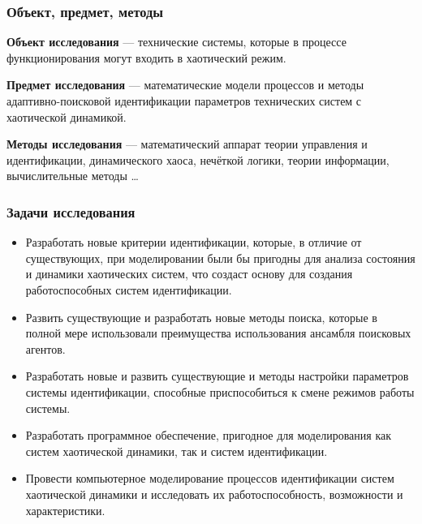 \documentclass[10pt,utf8]{beamer}
\begin{document}

\begin{frame}
  \frametitle{Объект, предмет, методы}

\textbf{Объект исследования} ---
технические системы, которые в процессе функционирования
могут входить в хаотический режим.

\medskip

\textbf{Предмет исследования} ---
математические модели процессов и методы
адаптивно-поисковой идентификации параметров технических систем с хаотической динамикой.

\medskip

\textbf{Методы исследования} ---
математический аппарат теории управления и идентификации,
динамического хаоса,
нечёткой логики,
теории информации,
вычислительные методы
\ldots

\end{frame}




\begin{frame}
  \frametitle{Задачи исследования}

  \begin{itemize}

    \item
      Разработать новые критерии идентификации, которые, в отличие от существующих,
      при моделировании были бы пригодны для анализа состояния и динамики хаотических
      систем, что создаст основу для создания работоспособных систем идентификации.

    \item
      Развить существующие и разработать новые методы поиска, которые в полной мере
      использовали преимущества использования ансамбля поисковых агентов.

    \item
      Разработать новые и развить существующие и  методы настройки параметров системы
      идентификации, способные приспособиться к смене режимов работы системы.

    \item
      Разработать программное обеспечение, пригодное для моделирования как систем
      хаотической динамики, так и систем идентификации.

    \item
      Провести компьютерное моделирование процессов идентификации систем хаотической
      динамики и исследовать их работоспособность, возможности и характеристики.

  \end{itemize}

\end{frame}
\end{document}
